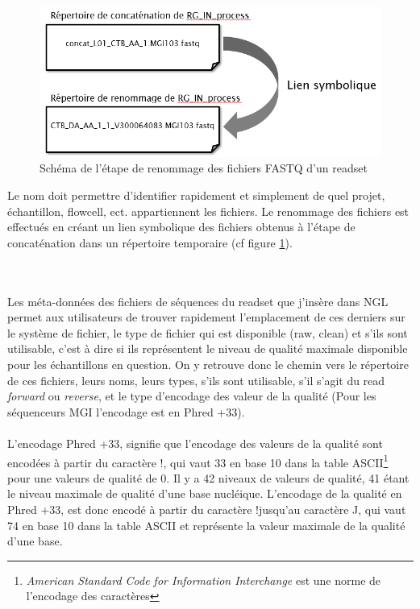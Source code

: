 \begin{minipage}{0.45\textwidth}
    \begin{figure}[H]
        \centering
        \includegraphics[width=1\textwidth]{img/Schema-renomage-fastq.png}
        \caption{\footnotesize{Schéma de l'étape de renommage des fichiers FASTQ d'un readset}}
        \label{schema-rename-fastq}
    \end{figure}
\end{minipage}
\hfill
\begin{minipage}{0.45\textwidth}
    Le nom doit permettre d'identifier rapidement et simplement de quel projet, échantillon, flowcell, ect.
    appartiennent les fichiers.
    Le renommage des fichiers est effectués en créant un lien symbolique des fichiers obtenus à l'étape de \og concaténation\fg{} dans un répertoire temporaire (cf figure \ref{schema-rename-fastq}).
\end{minipage}\\\\

Les méta-données des fichiers de séquences du readset que j'insère dans NGL permet aux utilisateurs de trouver rapidement l'emplacement de ces derniers sur le système de fichier, le type de fichier qui est disponible (\og raw\fg{}, \og clean\fg{}) et s'ils sont \og utilisable\fg{}, c'est à dire si ils représentent le niveau de qualité maximale disponible pour les échantillons en question.
On y retrouve donc le chemin vers le répertoire de ces fichiers, leurs noms, leurs types, s'ils sont utilisable, s'il s'agit du read \emph{forward} ou \emph{reverse}, et le type d'encodage des valeur de la qualité (Pour les séquenceurs MGI l'encodage est en Phred +33).\\\\

L'encodage Phred +33, signifie que l'encodage des valeurs de la qualité sont encodées à partir du caractère \og !\fg{}, qui vaut 33 en base 10 dans la table ASCII\footnote{\emph{American Standard Code for Information Interchange} est une norme de l'encodage des caractères} pour une valeurs de qualité de 0. Il y a 42 niveaux de valeurs de qualité, 41 étant le niveau maximale de qualité d'une base nucléique. L'encodage de la qualité en Phred +33, est donc encodé à partir du caractère \og !\fg jusqu'au caractère \og J\fg{}, qui vaut 74 en base 10 dans la table ASCII et représente la valeur maximale de la qualité d'une base.\\

